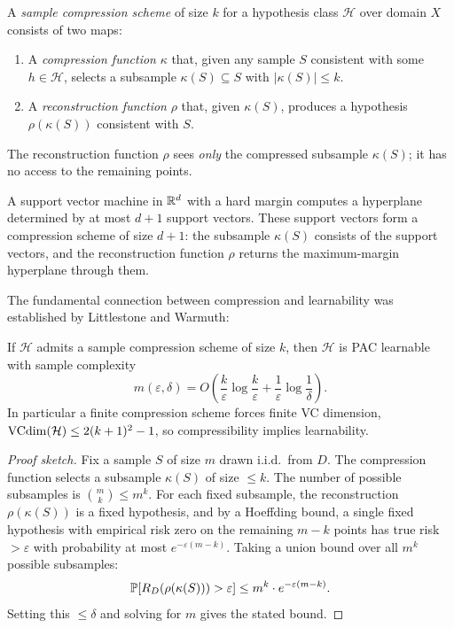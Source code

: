 \begin{defn}
\label{def:compression-scheme}
A \emph{sample compression scheme} of size $k$ for a hypothesis class
$\mathcal{H}$ over domain $X$ consists of two maps:
\begin{enumerate}[leftmargin=*, itemsep=2pt]
\item A \emph{compression function} $\kappa$ that, given any sample $S$
  consistent with some $h \in \mathcal{H}$, selects a subsample
  $\kappa(S) \subseteq S$ with $|\kappa(S)| \leq k$.
\item A \emph{reconstruction function} $\rho$ that, given $\kappa(S)$, produces
  a hypothesis $\rho(\kappa(S))$ consistent with $S$.
\end{enumerate}
The reconstruction function $\rho$ sees \emph{only} the compressed subsample
$\kappa(S)$; it has no access to the remaining points.
\end{defn}

\begin{example}
\label{ex:svm-compression}
A support vector machine in $\mathbb{R}^d$ with a hard margin computes a
hyperplane determined by at most $d+1$ support vectors.  These support vectors
form a compression scheme of size $d+1$: the subsample $\kappa(S)$ consists of
the support vectors, and the reconstruction function $\rho$ returns the
maximum-margin hyperplane through them.
\end{example}

The fundamental connection between compression and learnability was established
by Littlestone and Warmuth:

\begin{thm}
\label{thm:compression-pac}
If $\mathcal{H}$ admits a sample compression scheme of size $k$, then
$\mathcal{H}$ is PAC learnable with sample complexity
\[
  m(\varepsilon, \delta) = O\!\left(\frac{k}{\varepsilon}
    \log\frac{k}{\varepsilon} + \frac{1}{\varepsilon}\log\frac{1}{\delta}\right).
\]
In particular a finite compression scheme forces finite VC dimension, $\mathrm{VCdim}(\mathcal{H}) \leq 2(k+1)^2 - 1$, so compressibility implies learnability.
\end{thm}

\begin{proof}[Proof sketch]
Fix a sample $S$ of size $m$ drawn i.i.d.\ from $D$.  The compression function
selects a subsample $\kappa(S)$ of size $\leq k$.  The number of possible
subsamples is $\binom{m}{k} \leq m^k$.  For each fixed subsample, the
reconstruction $\rho(\kappa(S))$ is a fixed hypothesis, and by a Hoeffding
bound, a single fixed hypothesis with empirical risk zero on the remaining
$m - k$ points has true risk $> \varepsilon$ with probability at most
$e^{-\varepsilon(m-k)}$.  Taking a union bound over all $m^k$ possible
subsamples:
\[
  \mathbb{P}[R_D(\rho(\kappa(S))) > \varepsilon] \leq m^k \cdot e^{-\varepsilon(m-k)}.
\]
Setting this $\leq \delta$ and solving for $m$ gives the stated bound.
\end{proof}

